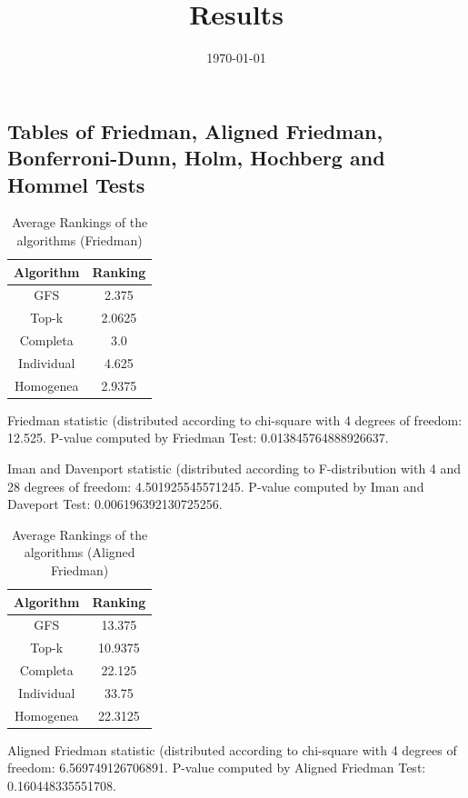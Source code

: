 \documentclass[a4paper,10pt]{article}
\title{Results}
\author{}
\date{\today}
\begin{document}
\begin{landscape}
\oddsidemargin 0in \topmargin 0in\maketitle
\section{Tables of Friedman, Aligned Friedman, Bonferroni-Dunn, Holm, Hochberg and Hommel Tests}
\begin{table}[!htp]
\centering
\caption{Average Rankings of the algorithms (Friedman)
}\begin{tabular}{c|c}
Algorithm&Ranking\\
\hline
GFS&2.375\\
Top-k&2.0625\\
Completa&3.0\\
Individual&4.625\\
Homogenea&2.9375\\
\end{tabular}
\end{table}


Friedman statistic (distributed according to chi-square with 4 degrees of freedom: 12.525. 
P-value computed by Friedman Test: 0.013845764888926637.\newline

Iman and Davenport statistic (distributed according to F-distribution with 4 and 28 degrees of freedom: 4.501925545571245. 
P-value computed by Iman and Daveport Test: 0.006196392130725256.\newline


\newpage

\begin{table}[!htp]
\centering
\caption{Average Rankings of the algorithms (Aligned Friedman)
}\begin{tabular}{c|c}
Algorithm&Ranking\\
\hline
GFS&13.375\\
Top-k&10.9375\\
Completa&22.125\\
Individual&33.75\\
Homogenea&22.3125\\
\end{tabular}
\end{table}


Aligned Friedman statistic (distributed according to chi-square with 4 degrees of freedom: 6.569749126706891. 
P-value computed by Aligned Friedman Test: 0.160448335551708.\newline



\end{landscape}
\end{document}
